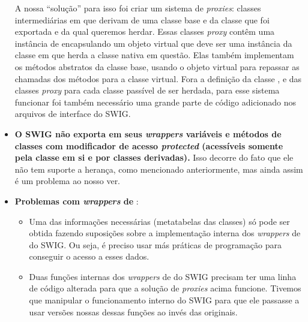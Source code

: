 \begin{itemize}
      A nossa ``solução'' para isso foi criar um sistema de \textit{proxies}\footnotemark{}: classes
      intermediárias em \CXX{} que derivam de uma classe base  e da classe
      \CXX{} que foi exportada e da qual queremos herdar. Essas classes \textit{proxy} contêm uma
      instância de \VObj{} encapsulando um objeto virtual que deve ser uma instância da classe em
      \script{} que herda a classe nativa em questão. Elas também implementam os métodos abstratos
      da classe base, usando o objeto virtual para repassar as chamadas dos métodos para a classe
      virtual. Fora a definição da classe , e das classes \textit{proxy} para cada
      classe \CXX{} passível de ser herdada, para esse sistema funcionar foi também necessário uma
      grande parte de código adicionado nos arquivos de interface do SWIG.
      
      
    \item \textbf{O SWIG não exporta em seus \textit{wrappers} variáveis e métodos de classes com 
      modificador de acesso \textit{protected} (acessíveis somente pela classe em si e por 
      classes derivadas).} Isso decorre do fato que ele não tem suporte a herança, como mencionado
      anteriormente, mas ainda assim é um problema ao nosso ver.
    \item \textbf{Problemas com \textit{wrappers} de }:
      \begin{itemize}
        \item Uma das informações necessárias (metatabelas das classes) só pode ser obtida
          fazendo suposições sobre a implementação interna dos \textit{wrappers} de 
          do SWIG. Ou seja, é preciso usar más práticas de programação para conseguir o
          acesso a esses dados.
        \item Duas funções internas dos \textit{wrappers} de  do SWIG precisam ter uma
          linha de código alterada para que a solução de \textit{proxies} acima funcione.
          Tivemos que manipular o funcionamento interno do SWIG para que ele passasse a usar
          versões nossas dessas funções ao invés das originais.
      \end{itemize}
  \end{itemize}
  

